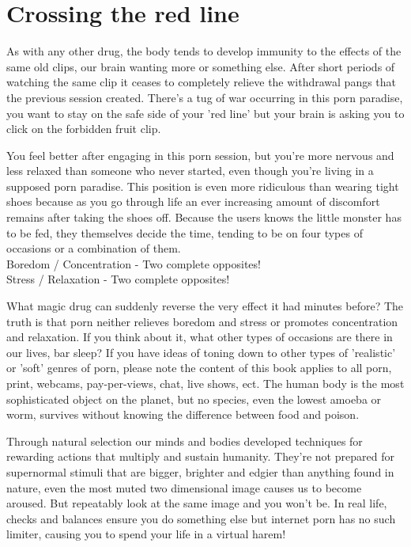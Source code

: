 \documentclass[
]{book}
\begin{document}
\hypertarget{crossing-the-red-line}{%
\section{Crossing the red line}\label{crossing-the-red-line}}

As with any other drug, the body tends to develop immunity to the effects of the same old clips, our brain wanting more or something else. After short periods of watching the same clip it ceases to completely relieve the withdrawal pangs that the previous session created. There's a tug of war occurring in this porn paradise, you want to stay on the safe side of your 'red line' but your brain is asking you to click on the forbidden fruit clip.

You feel better after engaging in this porn session, but you're more nervous and less relaxed than someone who never started, even though you're living in a supposed porn paradise. This position is even more ridiculous than wearing tight shoes because as you go through life an ever increasing amount of discomfort remains after taking the shoes off. Because the users knows the little monster has to be fed, they themselves decide the time, tending to be on four types of occasions or a combination of them.\\
Boredom / Concentration - Two complete opposites!\\
Stress / Relaxation - Two complete opposites!

What magic drug can suddenly reverse the very effect it had minutes before? The truth is that porn neither relieves boredom and stress or promotes concentration and relaxation. If you think about it, what other types of occasions are there in our lives, bar sleep? If you have ideas of toning down to other types of 'realistic' or 'soft' genres of porn, please note the content of this book applies to all porn, print, webcams, pay-per-views, chat, live shows, ect. The human body is the most sophisticated object on the planet, but no species, even the lowest amoeba or worm, survives without knowing the difference between food and poison.

Through natural selection our minds and bodies developed techniques for rewarding actions that multiply and sustain humanity. They're not prepared for supernormal stimuli that are bigger, brighter and edgier than anything found in nature, even the most muted two dimensional image causes us to become aroused. But repeatably look at the same image and you won't be. In real life, checks and balances ensure you do something else but internet porn has no such limiter, causing you to spend your life in a virtual harem!
\end{document}
